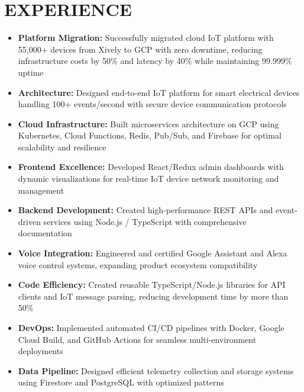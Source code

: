 \documentclass{fullstackdeveloper-ats}
\begin{document}
\section{EXPERIENCE}


\begin{itemize}
    \item \textbf{Platform Migration:} Successfully migrated cloud IoT platform with 55,000+ devices from Xively to GCP with zero downtime, reducing infrastructure costs by 50\% and latency by 40\% while maintaining 99.999\% uptime
    \item \textbf{Architecture:} Designed end-to-end IoT platform for smart electrical devices handling 100+ events/second with secure device communication protocols
    \item \textbf{Cloud Infrastructure:} Built microservices architecture on GCP using Kubernetes, Cloud Functions, Redis, Pub/Sub, and Firebase for optimal scalability and resilience
    \item \textbf{Frontend Excellence:} Developed React/Redux admin dashboards with dynamic visualizations for real-time IoT device network monitoring and management
    \item \textbf{Backend Development:} Created high-performance REST APIs and event-driven services using Node.js /  TypeScript with comprehensive documentation
    \item \textbf{Voice Integration:} Engineered and certified Google Assistant and Alexa voice control systems, expanding product ecosystem compatibility
    \item \textbf{Code Efficiency:} Created reusable TypeScript/Node.js libraries for API clients and IoT message parsing, reducing development time by more than 50\%
    \item \textbf{DevOps:} Implemented automated CI/CD pipelines with Docker, Google Cloud Build, and GitHub Actions for seamless multi-environment deployments
    \item \textbf{Data Pipeline:} Designed efficient telemetry collection and storage systems using Firestore and PostgreSQL with optimized patterns
\end{itemize}

\vspace{0.5cm}
\end{document}
